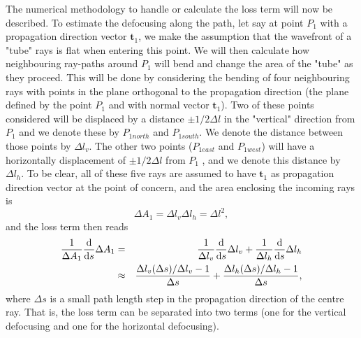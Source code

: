 The numerical methodology to handle or calculate the loss term will now be
described. To estimate the defocusing along the path, let say at point
\(P_{1}\) with a propagation direction vector \(\mathbf{t}_{1}\), we make the
assumption that the wavefront of a "tube" rays is flat when entering this
point. We will then calculate how neighbouring ray-paths around \(P_{1}\) will
bend and change the area of the "tube" as they proceed. This will be done by
considering the bending of four neighbouring rays with points in the plane
orthogonal to the propagation direction (the plane defined by the point
\(P_{1}\) and with normal vector \(\mathbf{t}_{1}\)). Two of these points
considered will be displaced by a distance \(\pm 1/2\Delta l\) in the
"vertical" direction from \(P_{1}\) and we denote these by \(P_{1north}\) and
\(P_{1south}\). We denote the distance between those points by \(\Delta
l_{v}\). The other two points (\(P_{1east}\) and \( P_{1west}\)) will have a
horizontally displacement of \(\pm 1/2\Delta l\) from \(P_{1}\) , and we denote
this distance by \(\Delta l_{h}\). To be clear, all of these five rays are
assumed to have \(\mathbf{t}_{1}\) as propagation direction vector at the point
of concern, and the area enclosing the incoming rays is
\begin{equation}
\Delta A_{1}= \Delta l_{v}\Delta l_{h}=\Delta l^{2},
\end{equation}
and the loss term then reads
\begin{eqnarray}
\frac{1}{\Delta A_{1}}\frac{\mathrm{d}}{\mathrm{d} s}\Delta A_{1} &=&
\frac{1}{\Delta l_{v} }\frac{\mathrm{d}}{\mathrm{d} s}\Delta l_{v}+
\frac{1}{\Delta l_{h}}\frac{\mathrm{d}}{\mathrm{d} s}\Delta l_{h} \nonumber \\
&\approx& \frac{\Delta l_{v}(\Delta s)/\Delta l_{v}-1}{\Delta s}+
 \frac{\Delta l_{h}(\Delta s)/\Delta l_{h}-1}{\Delta s},
\end{eqnarray}
where \(\Delta s\) is a small path length step in the propagation direction of the centre ray. 
That is, the loss term can be separated into two terms (one for the vertical defocusing and
one for the horizontal defocusing).

